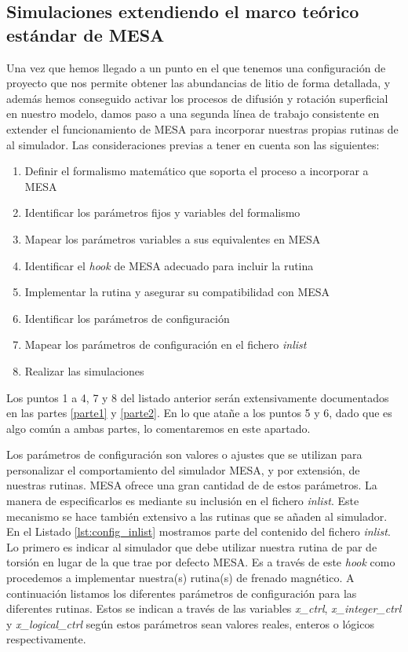 \subsection{Simulaciones extendiendo el marco teórico estándar de MESA}
Una vez que hemos llegado a un punto en el que tenemos una configuración de proyecto que nos permite obtener las abundancias de litio de forma detallada, y además hemos conseguido activar los procesos de difusión y rotación superficial en nuestro modelo, damos paso a una segunda línea de trabajo consistente en extender el funcionamiento de MESA para incorporar nuestras propias rutinas de al simulador. Las consideraciones previas a tener en cuenta son las siguientes:

\begin{enumerate}
	\item Definir el formalismo matemático que soporta el proceso a incorporar a MESA
	\item Identificar los parámetros fijos y variables del formalismo
	\item Mapear los parámetros variables a sus equivalentes en MESA
	\item Identificar el \textit{hook} de MESA adecuado para incluir la rutina
	\item Implementar la rutina y asegurar su compatibilidad con MESA
	\item Identificar los parámetros de configuración
	\item Mapear los parámetros de configuración en el fichero \textit{inlist}
	\item Realizar las simulaciones
\end{enumerate}

Los puntos 1 a 4, 7 y 8 del listado anterior serán extensivamente documentados en las partes \ref{parte1} y \ref{parte2}. En lo que atañe a los puntos 5 y 6, dado que es algo común a ambas partes, lo comentaremos en este apartado.\par

Los parámetros de configuración son valores o ajustes que se utilizan para personalizar el comportamiento del simulador MESA, y por extensión, de nuestras rutinas. MESA ofrece una gran cantidad de de estos parámetros. La manera de especificarlos es mediante su inclusión en el fichero \textit{inlist}. Este mecanismo se hace también extensivo a las rutinas que se añaden al simulador. En el Listado \ref{lst:config_inlist} mostramos parte del contenido del fichero \textit{inlist}. Lo primero es indicar al simulador que debe utilizar nuestra rutina de par de torsión en lugar de la que trae por defecto MESA. Es a través de este \textit{hook} como procedemos a implementar nuestra(s) rutina(s) de frenado magnético. A continuación listamos los diferentes parámetros de configuración para las diferentes rutinas. Estos se indican a través de las variables \textit{x\_ctrl}, \textit{x\_integer\_ctrl} y \textit{x\_logical\_ctrl} según estos parámetros sean valores reales, enteros o lógicos respectivamente.\par 

